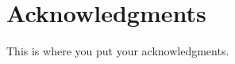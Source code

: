 


\chapter*{Acknowledgments}


 
\vspace{0.5in}
\noindent
This is where you put your acknowledgments. 

